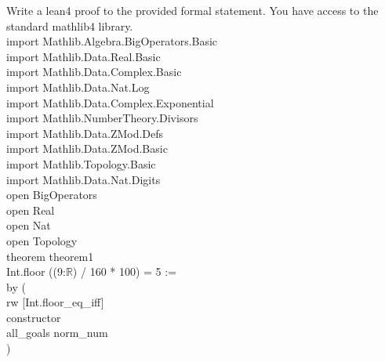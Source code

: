 \documentclass[11pt]{article}
\begin{document}
\begin{tcolorbox}[
    colback=gray!5,
    colframe=gray!75,
    title=Few-Shot Example,
    fonttitle=\bfseries
]
Write a lean4 proof to the provided formal statement. You have access to the standard mathlib4 library.\\
\textasciigrave \textasciigrave \textasciigrave import Mathlib.Algebra.BigOperators.Basic\\
import Mathlib.Data.Real.Basic\\
import Mathlib.Data.Complex.Basic\\
import Mathlib.Data.Nat.Log\\
import Mathlib.Data.Complex.Exponential\\
import Mathlib.NumberTheory.Divisors\\
import Mathlib.Data.ZMod.Defs\\
import Mathlib.Data.ZMod.Basic\\
import Mathlib.Topology.Basic\\
import Mathlib.Data.Nat.Digits\\

open BigOperators\\
open Real\\
open Nat\\
open Topology\\
theorem theorem1\\
  Int.floor ((9:$\mathbb{R}$) / 160 * 100) = 5 :=\\
by (\\
  rw [Int.floor\_eq\_iff]\\
  constructor\\
  all\_goals norm\_num\\
)\textasciigrave \textasciigrave \textasciigrave
\end{tcolorbox}
\end{document}
